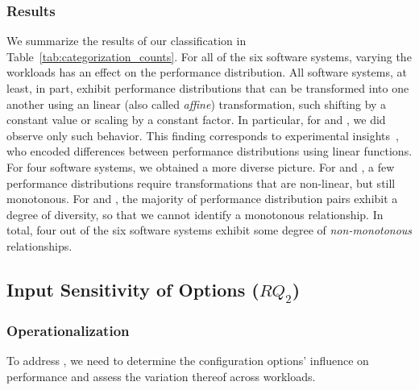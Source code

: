 {\subsubsection{Results}
We summarize the results of our classification in Table~\ref{tab:categorization_counts}. For all of the six software systems, varying the workloads has an effect on the performance distribution. All software systems, at least, in part, exhibit performance distributions that can be transformed into one another using an linear (also called \textit{affine}) transformation, such shifting by a constant value or scaling by a constant factor. In particular, for \jumper and \jadx, we did  observe only such behavior. This finding corresponds to experimental insights~\citeauthor{jamishidi_transfer_2017}, who encoded differences between performance distributions using linear functions. For four software systems, we obtained a more diverse picture. For \kanzi and \batik, a few performance distributions require transformations that are non-linear, but still monotonous. For \dconvert and \htwo, the majority of performance distribution pairs {\color{purple}exhibit a degree of diversity, so that we cannot identify a monotonous relationship.} In total, four out of the six software systems exhibit {\color{purple}some degree} of \emph{non-monotonous} relationships.
\vspace{2mm}

\subsection{Input Sensitivity of Options ($RQ_2$)}\label{sec:rq2}

\subsubsection{Operationalization}
To address , we need to determine the configuration options’ influence on performance and assess the variation thereof across workloads. 

}
